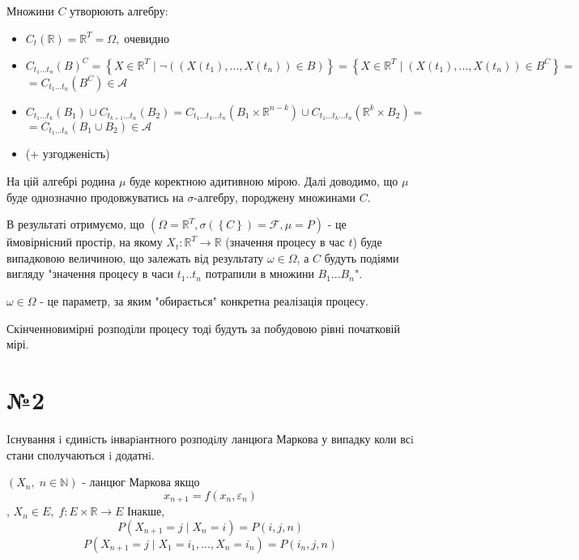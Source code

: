 \documentclass[11pt, a4paper]{article} %
\begin{document}
Множини $C$ утворюють алгебру:
\begin{itemize}
    \item 
    \(C_t(\mathbb R) = \mathbb{R}^T = \Omega,\; \text{очевидно}\)
    \item
    \(C_{t_1...t_n}(B)^C = \left\{X \in \mathbb{R}^T \;|\; \neg \left( (X(t_1), ..., X(t_n)) \in B\right)\right\} = \left\{X \in \mathbb{R}^T \;|\; (X(t_1), ..., X(t_n)) \in B^C\right\} =\) \\
    \(= C_{t_1...t_n}(B^C) \in \mathcal A\)
    \item
    \(C_{t_1...t_k}(B_1) \cup C_{t_{k+1}...t_n}(B_2) = C_{t_1...t_k...t_n}(B_1 \times \mathbb R^{n-k})\cup C_{t_1...t_k...t_n}(\mathbb R^k \times B_2) = \) \\
    \(= C_{t_1...t_n}(B_1 \cup B_2) \in \mathcal A\)
    \item (+ узгодженість)
\end{itemize}


На цій алгебрі родина $\mu$ буде коректною адитивною мірою.
Далі доводимо, що $\mu$ буде однозначно продовжуватись на $\sigma$-алгебру, породжену множинами $C$.

В результаті отримуємо, що $\left(\Omega=\mathbb{R}^T, \sigma(\left\{C\right\})=\mathcal F, \mu = P\right)$ - це ймовірнісний простір, 
на якому $X_t : \mathbb{R}^T \to \mathbb R$ (значення процесу в час $t$) буде випадковою величиною, що залежать від результату $\omega \in \Omega$, 
а $C$ будуть подіями вигляду "значення процесу в часи $t_1..t_n$ потрапили в множини $B_1...B_n$". 

$\omega \in \Omega$ - це параметр, за яким "обирається" конкретна реалізація процесу.

Скінченновимірні розподіли процесу тоді будуть за побудовою рівні початковій мірі.


\section*{№2}
\begin{mdframed}
    Iснування i єдинiсть iнварiантного розподiлу ланцюга Маркова у випадку коли всi стани
сполучаються i додатнi.
\end{mdframed}

$(X_n, \; n\in \mathbb N)$ - ланцюг Маркова якщо
\[x_{n+1} = f(x_n, \varepsilon_n)\]
, $X_n \in E, \; f : E\times\mathbb R \to E$
Інакше, 
\[P(X_{n+1} = j \;|\; X_{n} = i) = P(i,j,n)\]
\[P(X_{n+1} = j \;|\; X_{1} = i_1, ..., X_{n} = i_n) = P(i_n,j,n)\]
\end{document}
